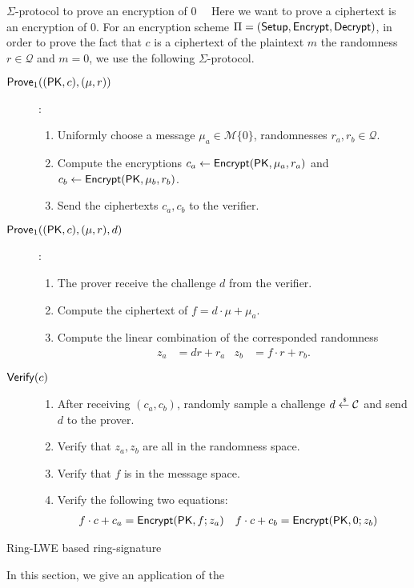 \begin{section}{$\Sigma$-protocol to prove an encryption of $0$~\cite{DBLP:conf/pkc/ChaidosG15}~\label{sigma0}}
  Here we want to prove a ciphertext is an encryption of $0$.
  For an encryption scheme $\Pi = ({\mathsf{Setup}}, {\mathsf{Encrypt}}, {\mathsf{Decrypt}})$,
  in order to prove the fact that $c$ is a ciphertext of the plaintext $m$ \wrt the randomness $r \in \mathcal{Q}$ and $m  = 0$,
  we use the following $\Sigma$-protocol.

  \begin{description}
    \item[${\mathsf{Prove}}_1((\mathsf{PK}, c), (\mu, r))$]:
    \begin{enumerate}
      \item Uniformly choose a message $\mu_a \in \mathcal{M} \{0\}$, randomnesses $r_a, r_b \in \mathcal{Q}$.
      \item Compute the encryptions $c_a \gets {\mathsf{Encrypt}}(\mathsf{PK}, \mu_a, r_a)$ and $c_b \gets {\mathsf{Encrypt}}(\mathsf{PK}, \mu_b, r_b)$.
      \item Send the ciphertexts $c_a, c_b$ to the verifier.
    \end{enumerate}
    \item[${\mathsf{Prove}}_1((\mathsf{PK}, c), (\mu, r), d)$]:
    \begin{enumerate}
      \item The prover receive the challenge $d$ from the verifier.
      \item Compute the ciphertext of $f = d \cdot \mu + \mu_a$.
      \item Compute the linear combination of the corresponded randomness
      \begin{align*}
        z_a &= d r + r_a  & z_b &= f \cdot r + r_b.
      \end{align*}
    \end{enumerate}
  \item[${\mathsf{Verify}}(c)$]
    \begin{enumerate}
    \item After receiving $(c_a, c_b)$, randomly sample a challenge $ d \stackrel{{\scriptscriptstyle \mkern4mu \$}}{\gets} \mathcal{C}$ and send $d$ to the prover.
    \item Verify that $z_a, z_b$ are all in the randomness space.
    \item Verify that $f$ is in the message space.
    \item Verify the following two equations:
      \begin{align*}
        f \cdot c + c_a &= {\mathsf{Encrypt}}(\mathsf{PK}, f; z_a) &  f \cdot c + c_b &= {\mathsf{Encrypt}}(\mathsf{PK}, 0; z_b)
      \end{align*}
    \end{enumerate}
  \end{description}



\end{section}


\begin{section}{Ring-LWE based ring-signature}

  In this section, we give an application of the


\end{section}
